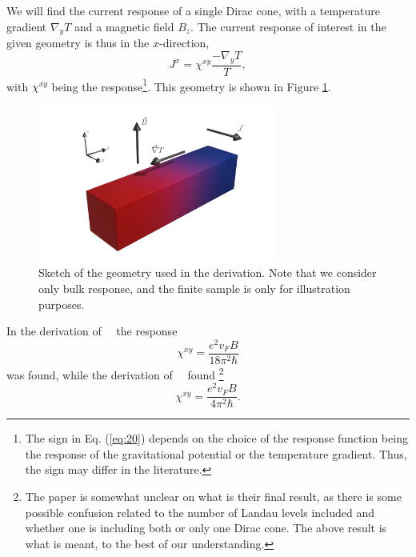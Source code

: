 We will find the current response of a single Dirac cone, with a temperature gradient $\nabla_y T$ and a magnetic field $B_z$.
The current response of interest in the given geometry is thus in the $x$-direction,
\begin{equation}\label{eq:20}
  J^x = \chi ^{xy} \frac{- \nabla _yT}{T},
\end{equation}
with $\chi^{xy}$  being the response\footnote{The sign in Eq. (\ref{eq:20}) depends on the choice of the response function being the response of the gravitational potential or the temperature gradient. Thus, the sign may differ in the literature.}.
This geometry is shown in Figure \ref{fig:setup}.
\begin{figure}[ht]
  \centering
  \includegraphics[width=0.7\textwidth]{figures/setup.png}
  \caption{Sketch of the geometry used in the derivation. Note that we consider only bulk response, and the finite sample is only for illustration purposes. \label{fig:setup}}
\end{figure}
In the derivation of~\citeauthor{chernodubGenerationNernstCurrent2018}~\cite{chernodubGenerationNernstCurrent2018} the response
\begin{equation}
  \chi ^{xy} = \frac{e^2 v_F B}{18 \pi ^2 \hbar }
\end{equation}
was found, while the derivation of~\citeauthor{arjonaFingerprintsConformalAnomaly2019}~\cite{arjonaFingerprintsConformalAnomaly2019} found
\footnote{The paper is somewhat unclear on what is their final result, as there is some possible confusion related to the number of Landau levels included and whether one is including both or only one Dirac cone.
The above result is what is meant, to the best of our understanding.}
\begin{equation}
  \chi ^{xy} = \frac{e^2 v_F B}{4 \pi ^2 \hbar }.
\end{equation}

